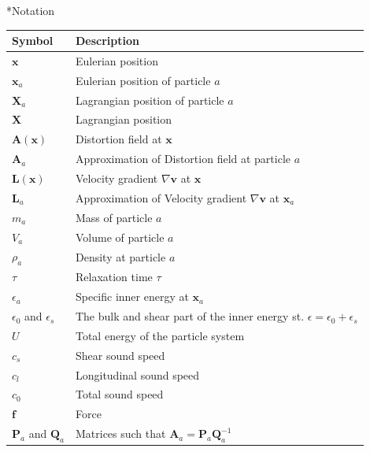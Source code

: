 \documentclass[oneside, a4paper, onecolumn, 11pt]{article}
\renewcommand{\AA}{\mathbf{A}}
\newcommand{\PP}{\mathbf{P}}
\newcommand{\vv}{\mathbf{v}}
\newcommand{\xx}{\mathbf{x}}
\newcommand{\XX}{\mathbf{X}}
\newcommand{\QQ}{\mathbf{Q}}
\newcommand{\LL}{\mathbf{L}}
\newcommand{\ff}{\mathbf{f}}
\begin{document}
\begin{subsection}*{Notation}

%
\begin{tabular}{ll}
    \toprule
    Symbol & Description \\
    \midrule
    $\xx$ & Eulerian position\\
    $\xx_a$ & Eulerian position of particle $a$ \\
    $\XX_a$ & Lagrangian position of particle $a$ \\
    $\XX$ & Lagrangian position\\
    $\AA(\xx)$ & Distortion field at  $\xx$\\
    $\AA_a$ & Approximation of Distortion field at particle $a$\\
    $\LL(\xx)$ & Velocity gradient $\nabla \vv$ at $\xx$\\
    $\LL_a$ & Approximation of Velocity gradient $\nabla \vv$ at $\xx_a$\\
    \midrule
    $m_a$ & Mass of particle $a$ \\
    $V_a$ & Volume of particle $a$ \\
    $\rho_a$ & Density at particle $a$\\
    $\tau$ & Relaxation time $\tau$ \\
    $\epsilon_a$ & Specific inner energy at $\xx_a$ \\
    $\epsilon_{0}$ and $\epsilon_{s}$ & 
    The bulk and shear part of the inner energy st.
    $\epsilon = \epsilon_{0} + \epsilon_s $\\
    $U$ & Total energy of the particle system\\
    $c_s$ & Shear sound speed\\
    $c_l$ & Longitudinal sound speed\\
    $c_0$ & Total sound speed\\
    $\ff$ & Force\\
    $\PP_a$ and $\QQ_a$ & Matrices such that $\AA_{a} = \PP_{a} \QQ_a^{-1}$ \\

\end{tabular}
\end{subsection}
\end{document}

